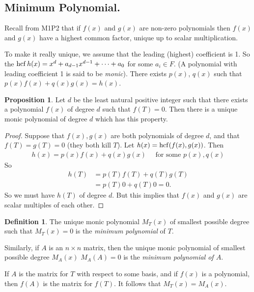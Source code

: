 \documentclass{article}
\theoremstyle{definition} \newtheorem*{definition}{Definition}
\newtheorem{proposition}[theorem]{Proposition}
\begin{document}
\subsection{Minimum Polynomial.}
Recall from M1P2 that if $f(x)$ and $g(x)$ are non-zero polynomials then
$f(x)$ and $g(x)$ have a highest common factor, unique up to scalar
multiplication.

To make it really unique, we assume that the leading (highest) coefficient
is 1. So the $\operatorname{hcf} h(x) = x^d + a_{d-1}x^{d-1} + \dots + a_0$ for some
$a_i \in F$. (A polynomial with leading coefficient 1 is said to be 
\emph{monic}).
There exists $p(x)$, $q(x)$ such that $p(x)f(x)+q(x)g(x)=h(x)$.\\

\begin{proposition}
  Let $d$ be the least natural positive integer such that there exists a
  polynomial $f(x)$ of degree $d$ such that $f(T)=0$. Then there is  a
  unique monic polynomial of degree $d$ which has this property.
\end{proposition}

\begin{proof}
  Suppose that $f(x),g(x)$ are both polynomials of degree $d$, and that
  $f(T)=g(T)=0$ (they both kill $T$). Let $h(x) = \operatorname{hcf} (f(x),g(x))$. Then
  \begin{align*}
    h(x) = p(x)f(x) + q(x)g(x) \quad \text{ for some } p(x),q(x)
  \end{align*}
  So 
  \begin{align*}
    h(T) &= p(T)f(T) + q(T)g(T) \\
    &= p(T)0 + q(T)0 = 0.
  \end{align*}
  So we must have $h(T)$ of degree $d$. But this implies that $f(x)$ and
  $g(x)$ are scalar multiples of each other.
\end{proof}

\begin{definition}
  The unique monic polynomial $M_T(x)$ of smallest possible degree such
  that $M_T(x)=0$ is the \emph{minimum polynomial} of $T$.

  Similarly, if $A$ is an $n \times n$ matrix, then the unique 
  monic  polynomial of smallest possible degree $M_A(x)$ 
  $M_A(A) = 0$ is the \emph{minimum polynomial of $A$}.\\
\end{definition}

\begin{remark}
  If $A$ is the matrix for $T$ with respect to some basis, and if $f(x)$ is
  a polynomial, then $f(A)$ is the matrix for $f(T)$. It follows that 
  $M_T(x)=M_A(x)$.\\
\end{remark}
\end{document}
